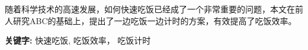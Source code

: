 
\quad \quad
随着科学技术的高速发展，如何快速吃饭已经成了一个非常重要的问题，本文在前人研究ABC的基础上，提出了一边吃饭一边计时的方案，有效提高了吃饭效率。

\noindent
\large \textbf{关键字:} 快速吃饭, 吃饭效率， 吃饭计时